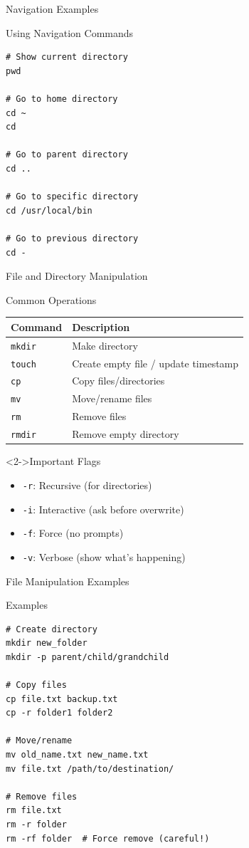 \documentclass[presentation,aspectratio=1610]{beamer}
\begin{document}
\begin{frame}[label={sec:orgc580ee1},fragile]{Navigation Examples}
 \begin{block}{Using Navigation Commands}
\begin{verbatim}
# Show current directory
pwd

# Go to home directory
cd ~
cd

# Go to parent directory
cd ..

# Go to specific directory
cd /usr/local/bin

# Go to previous directory
cd -
\end{verbatim}
\end{block}
\end{frame}
\begin{frame}[label={sec:orgc2e74e6},fragile]{File and Directory Manipulation}
 \begin{block}{Common Operations}
\begin{center}
\begin{tabular}{ll}
Command & Description\\
\hline
\texttt{mkdir} & Make directory\\
\texttt{touch} & Create empty file / update timestamp\\
\texttt{cp} & Copy files/directories\\
\texttt{mv} & Move/rename files\\
\texttt{rm} & Remove files\\
\texttt{rmdir} & Remove empty directory\\
\end{tabular}
\end{center}
\end{block}
\begin{alertblock}<2->{Important Flags}
\begin{itemize}
\item \texttt{-r}: Recursive (for directories)
\item \texttt{-i}: Interactive (ask before overwrite)
\item \texttt{-f}: Force (no prompts)
\item \texttt{-v}: Verbose (show what's happening)
\end{itemize}
\end{alertblock}
\end{frame}
\begin{frame}[label={sec:org6359184},fragile]{File Manipulation Examples}
 \begin{block}{Examples}
\begin{verbatim}
# Create directory
mkdir new_folder
mkdir -p parent/child/grandchild

# Copy files
cp file.txt backup.txt
cp -r folder1 folder2

# Move/rename
mv old_name.txt new_name.txt
mv file.txt /path/to/destination/

# Remove files
rm file.txt
rm -r folder
rm -rf folder  # Force remove (careful!)
\end{verbatim}
\end{block}
\end{frame}
\end{document}
